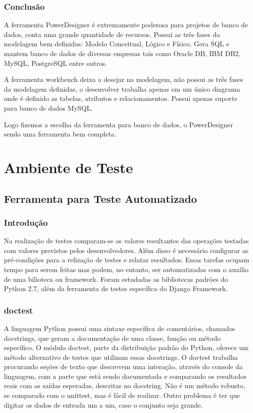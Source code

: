 \documentclass[12pt,a4paper]{article}
\begin{document}
		\subsubsection{Conclusão}
			A ferramenta PowerDesigner é extremamente poderosa para projetos de banco de dados, conta uma grande quantidade de
			recursos. Possui as três fases da modelagem bem definidas: Modelo Conceitual, Lógico e Físico. Gera SQL e mantem
			banco de dados de diversas empresas tais como Oracle DB, IBM DB2, MySQL, PostgreSQL entre outros.
			 
			A ferramenta workbench deixa a desejar na modelagem, não possui as três fases da modelagem definidas, o desenvolver
			trabalha apenas em um único diagrama onde é definido as tabelas, atributos e relacionamentos. Possui apenas suporte
			para banco de dados MySQL.
			
			Logo fizemos a escolha da ferramenta para banco de dados, o PowerDesigner sendo uma ferramenta bem completa.
		
\clearpage
\section{Ambiente de Teste}
	\subsection{Ferramenta para Teste Automatizado}
		\subsubsection{Introdução}
			Na realização de testes comparam-se os valores resultantes das
			operações testadas com valores previstos pelos desenvolvedores.
			Além disso é necessário configurar as pré-condições para a
			relização de testes e relatar resultados. Essas tarefas ocupam 
			tempo para serem feitas mas podem, no entanto, ser automatizadas
			com o auxílio de uma bilioteca ou framework.
			Foram estudadas as bibliotecas padrões do Python 2.7, além da
			ferramenta de testes específica do Django Framework.
		\subsubsection{doctest}
			A linguagem Python possui uma sintaxe específica de comentários, chamados docstrings,
			que geram a documentação de uma classe, função ou método específico.
			O módulo doctest, parte da distribuição padrão do Python, oferece um
			método alternativo de testes que utilizam essas docstrings.
			O doctest trabalha procurando seções de texto
			que descrevem uma interação, através do console da linguagem, com a parte que está
			sendo documentada e comparando os resultados reais
			com as saídas esperadas, descritas no docstring.
			Não é um método robusto, se comparado com o unittest, mas é fácil de realizar. Outro
			problema é ter que digitar os dados de entrada um a um, caso o conjunto seja grande.
\end{document}
